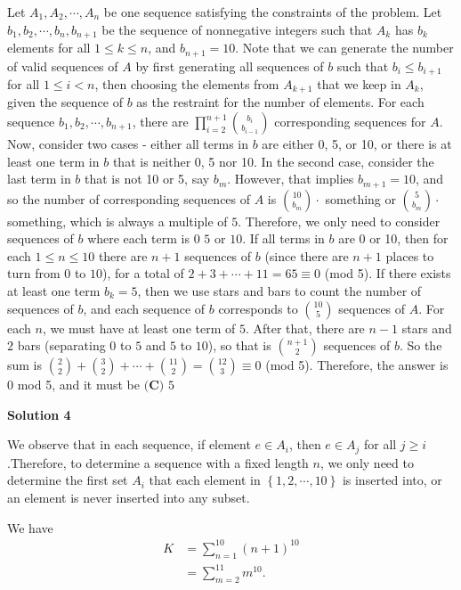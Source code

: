 \begin{enumerate}
 Let $A_1, A_2, \cdots, A_n$ be one sequence satisfying the constraints of the problem. Let $b_1, b_2, \cdots, b_n, b_{n+1}$ be the sequence of nonnegative integers such that $A_k$ has $b_k$ elements for all $1\leq{}k\leq{}n$, and $b_{n+1}=10$. Note that we can generate the number of valid sequences of $A$ by first generating all sequences of $b$ such that $b_i\leq{}b_{i+1}$ for all $1\leq{}i<n$, then choosing the elements from $A_{k+1}$ that we keep in $A_k$, given the sequence of $b$ as the restraint for the number of elements. For each sequence $b_1, b_2, \cdots{}, b_{n+1}$, there are $\prod_{i=2}^{n+1}\binom{b_i}{b_{i-1}}$ corresponding sequences for $A$. Now, consider two cases - either all terms in $b$ are either 0, 5, or 10, or there is at least one term in $b$ that is neither 0, 5 nor 10. In the second case, consider the last term in $b$ that is not 10 or 5, say $b_m$. However, that implies $b_{m+1}=10$, and so the number of corresponding sequences of $A$ is $\binom{10}{b_m}\cdot{}$ something or $\binom{5}{b_m}\cdot$ something, which is always a multiple of $5$. Therefore, we only need to consider sequences of $b$ where each term is $0$ $5$ or $10$. If all terms in $b$ are 0 or 10, then for each $1\leq{}n\leq{}10$ there are $n+1$ sequences of $b$ (since there are $n+1$ places to turn from $0$ to $10$), for a total of $2+3+\cdots+11=65\equiv0$ (mod 5). If there exists at least one term $b_k=5$, then we use stars and bars to count the number of sequences of $b$, and each sequence of $b$ corresponds to $\binom{10}{5}$ sequences of $A$. For each $n$, we must have at least one term of $5$. After that, there are $n-1$ stars and $2$ bars (separating $0$ to $5$ and $5$ to $10$), so that is $\binom{n+1}{2}$ sequences of $b$. So the sum is $\binom{2}{2}+\binom{3}{2}+\cdots+\binom{11}{2}=\binom{12}{3}\equiv0$ (mod 5). Therefore, the answer is 0 mod 5, and it must be $\boxed{\textbf{(C) } 5}$




\textbf{Solution 4}

We observe that in each sequence, if element $e \in A_i$, then $e \in A_j$ for all $j \geq i$.Therefore, to determine a sequence with a fixed length $n$, we only need to determine the first set $A_i$ that each element in $\left\{ 1, 2, \cdots , 10 \right\}$ is inserted into, or an element is never inserted into any subset.

 We have
 \begin{align*} K & = \sum_{n = 1}^{10} \left( n + 1 \right)^{10} \\ & = \sum_{m = 2}^{11} m^{10} . \end{align*}



\end{enumerate}

